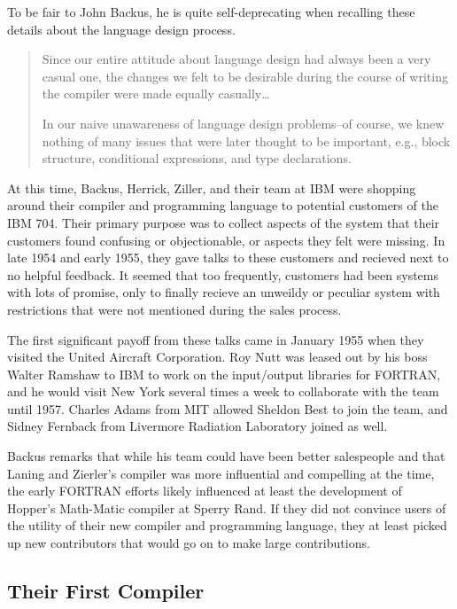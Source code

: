 To be fair to John Backus, he is quite self-deprecating when recalling these details about the
language design process.

\begin{quotation}
	Since our entire attitude about language design had always been a
	very casual one, the changes we felt to be desirable during the course
	of writing the compiler were made equally casually\dots

	In our naive unawareness of language design problems--of course,
	we knew nothing of many issues that were later thought to be important,
	e.g., block structure, conditional expressions, and type declarations.
\end{quotation}

At this time, Backus, Herrick, Ziller, and their team at IBM were shopping around
their compiler and programming language to potential customers of the IBM 704.
Their primary purpose was to collect aspects of the system that their customers found
confusing or objectionable, or aspects they felt were missing.
In late 1954 and early 1955, they gave talks to these customers and recieved next to
no helpful feedback.
It seemed that too frequently, customers had been systems with lots of promise, only to
finally recieve an unweildy or peculiar system with restrictions that were not mentioned
during the sales process.

The first significant payoff from these talks came in January 1955 when they visited the
United Aircraft Corporation. Roy Nutt was leased out by his boss Walter Ramshaw
to IBM to work on the input/output
libraries for FORTRAN, and he would visit New York several times a week to collaborate with
the team until 1957.
Charles Adams from MIT allowed Sheldon Best to join the team,
and Sidney Fernback from Livermore Radiation Laboratory joined as well.

Backus remarks that while his team could have been better salespeople and that
Laning and Zierler's compiler was more influential and compelling at the time, the early FORTRAN efforts
likely influenced at least the development of Hopper's Math-Matic compiler at
Sperry Rand.
If they did not convince users of the utility of their new compiler and programming language,
they at least picked up new contributors that would go on to make large contributions.

\subsection{Their First Compiler}


